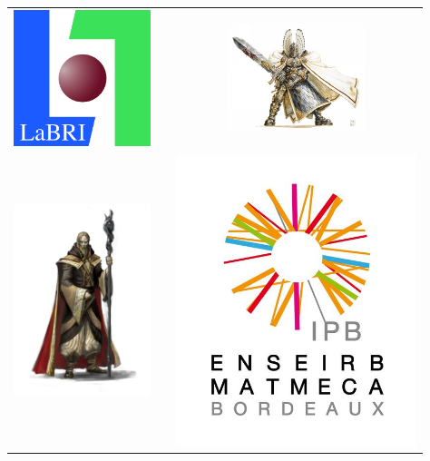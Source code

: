 
\begin{titlepage}
\begin{center}
  
  \begin{center}
    \begin{tabular}{c c c}
      

      \includegraphics [width=40mm]{Images/LABRI.jpg} & & \includegraphics [width=40mm]{Images/Guerrier.jpg}\\
      
       \includegraphics [width=40mm]{Images/Mage.jpg}& & \includegraphics [width=70mm]{Images/ENSEIRB-MATMECA.jpg} \\


\end{tabular}
\end{center}
\end{center}
\end{titlepage}
